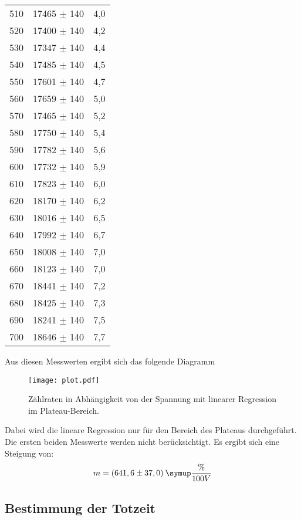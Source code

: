 \begin{table}[H]
\begin{tabular}{c c c}
    510 &	17465 $\pm$ 140 &	4,0 \\
    520 &	17400 $\pm$ 140 &	4,2 \\
    530 &	17347 $\pm$ 140 &	4,4 \\
    540 &	17485 $\pm$ 140 &	4,5 \\
    550 &	17601 $\pm$ 140 &	4,7 \\
    560 &	17659 $\pm$ 140 &	5,0 \\
    570 &	17465 $\pm$ 140 &	5,2 \\
    580 &	17750 $\pm$ 140 &	5,4 \\
    590 &	17782 $\pm$ 140 &	5,6 \\
    600 &	17732 $\pm$ 140 &	5,9 \\
    610 &	17823 $\pm$ 140 &	6,0 \\
    620 &	18170 $\pm$ 140 &	6,2 \\
    630 &	18016 $\pm$ 140 &	6,5 \\
    640 &	17992 $\pm$ 140 &	6,7 \\
    650 &	18008 $\pm$ 140 &	7,0 \\
    660 &	18123 $\pm$ 140 &	7,0 \\
    670 &	18441 $\pm$ 140 &	7,2 \\
    680 &	18425 $\pm$ 140 &	7,3 \\
    690 &	18241 $\pm$ 140 &	7,5 \\
    700 &	18646 $\pm$ 140 &	7,7 \\
    \bottomrule
  \end{tabular}
\end{table}

Aus diesen Messwerten ergibt sich das folgende Diagramm

\begin{figure}
  \centering
  \texttt{[image: plot.pdf]}
  \caption{Zählraten in Abhängigkeit von der Spannung mit linearer Regression im Plateau-Bereich.}
  \label{fig:plot}
\end{figure}

Dabei wird die lineare Regression nur für den Bereich des Plateaus durchgeführt. Die ersten beiden
Messwerte werden nicht berücksichtigt.
Es ergibt sich eine Steigung von:
\begin{equation*}
  m = (641,6 \pm 37,0) \: \symup{\frac{\%}{100V}}
\end{equation*}








\subsection{Bestimmung der Totzeit}

